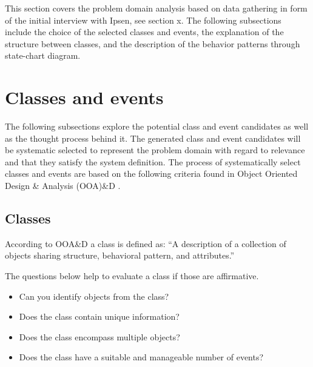 This section covers the problem domain analysis based on data gathering in form of the initial interview with Ipsen, see section x.
The following subsections include the choice of the selected classes and events, the explanation of the structure between classes, and the description of the behavior patterns through state-chart diagram.

\section{Classes and events}
The following subsections explore the potential class and event candidates as well as the thought process behind it.
The generated class and event candidates will be systematic selected to represent the problem domain with regard to relevance and that they satisfy the system definition.
The process of systematically select classes and events are based on the following criteria found in Object Oriented Design \& Analysis (OOA)\&D \citep[p.~63-67]{Rod-Aalborg} .

\subsection{Classes}
According to OOA\&D a class is defined as:
“A description of a collection of objects sharing structure, behavioral pattern, and attributes.”

The questions below help to evaluate a class if those are affirmative. \citep[p.~62]{Rod-Aalborg}
\begin{itemize}
	\item Can you identify objects from the class?
	\item Does the class contain unique information?
	\item Does the class encompass multiple objects?
	\item Does the class have a suitable and manageable number of events?
\end{itemize}

